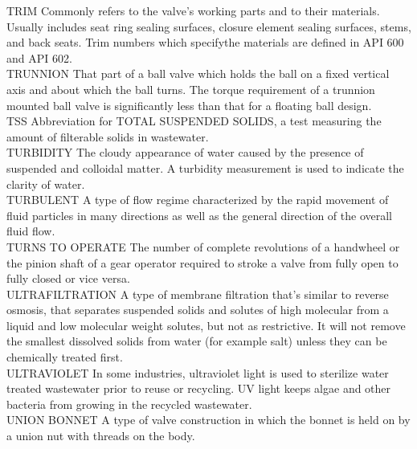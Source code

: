 TRIM
Commonly refers to the valve's working parts and to their materials. Usually includes seat ring sealing surfaces, closure element sealing surfaces, stems, and back seats. Trim numbers which specifythe materials are defined in API 600 and API 602.
\vspace{0.3cm}\\
TRUNNION
That part of a ball valve which holds the ball on a fixed vertical axis and about which the ball turns. The torque requirement of a trunnion mounted ball valve is significantly less than that for a floating ball design.
\vspace{0.3cm}\\
TSS
Abbreviation for TOTAL SUSPENDED SOLIDS, a test measuring the amount of filterable solids in wastewater.
\vspace{0.3cm}\\
TURBIDITY
The cloudy appearance of water caused by the presence of suspended and colloidal matter. A turbidity measurement is used to indicate the clarity of water.
\vspace{0.3cm}\\
TURBULENT
A type of flow regime characterized by the rapid movement of fluid particles in many directions as well as the general direction of the overall fluid flow.
\vspace{0.3cm}\\
TURNS TO OPERATE
The number of complete revolutions of a handwheel or the pinion shaft of a gear operator required to stroke a valve from fully open to fully closed or vice versa.
\vspace{0.3cm}\\
ULTRAFILTRATION
A type of membrane filtration that’s similar to reverse osmosis, that separates suspended solids and solutes of high molecular from a liquid and low molecular weight solutes, but not as restrictive. It will not remove the smallest dissolved solids from water (for example salt) unless they can be chemically treated first.
\vspace{0.3cm}\\
ULTRAVIOLET
In some industries, ultraviolet light is used to sterilize water treated wastewater prior to reuse or recycling. UV light keeps algae and other bacteria from growing in the recycled wastewater.
\vspace{0.3cm}\\
UNION BONNET
A type of valve construction in which the bonnet is held on by a union nut with threads on the body.
\vspace{0.3cm}\\
